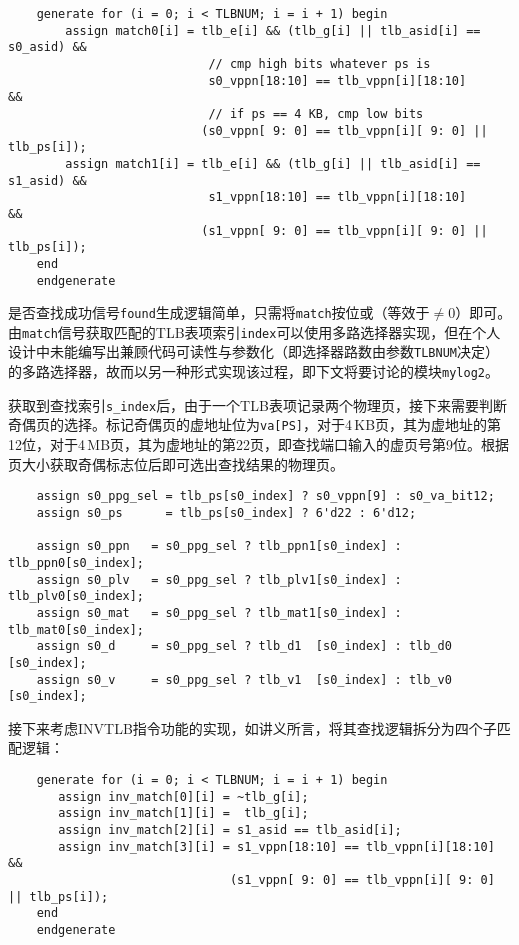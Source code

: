\documentclass[UTF-8,twoside,c5size]{ctexart}
\begin{document}
    \begin{verbatim}
    generate for (i = 0; i < TLBNUM; i = i + 1) begin
        assign match0[i] = tlb_e[i] && (tlb_g[i] || tlb_asid[i] == s0_asid) &&
                            // cmp high bits whatever ps is
                            s0_vppn[18:10] == tlb_vppn[i][18:10]            &&  
                            // if ps == 4 KB, cmp low bits
                           (s0_vppn[ 9: 0] == tlb_vppn[i][ 9: 0] || tlb_ps[i]); 
        assign match1[i] = tlb_e[i] && (tlb_g[i] || tlb_asid[i] == s1_asid) &&
                            s1_vppn[18:10] == tlb_vppn[i][18:10]            &&
                           (s1_vppn[ 9: 0] == tlb_vppn[i][ 9: 0] || tlb_ps[i]);
    end
    endgenerate
    \end{verbatim}
    
    是否查找成功信号\texttt{found}生成逻辑简单，只需将\texttt{match}按位或（等效于$ \neq 0 $）即可。由\texttt{match}信号获取匹配的TLB表项索引\texttt{index}可以使用多路选择器实现，但在个人设计中未能编写出兼顾代码可读性与参数化（即选择器路数由参数\texttt{TLBNUM}决定）的多路选择器，故而以另一种形式实现该过程，即下文将要讨论的模块\texttt{mylog2}。
    
    获取到查找索引\texttt{s_index}后，由于一个TLB表项记录两个物理页，接下来需要判断奇偶页的选择。标记奇偶页的虚地址位为\texttt{va[PS]}，对于4\,KB页，其为虚地址的第12位，对于4\,MB页，其为虚地址的第22页，即查找端口输入的虚页号第9位。根据页大小获取奇偶标志位后即可选出查找结果的物理页。
    
    \begin{verbatim}
    assign s0_ppg_sel = tlb_ps[s0_index] ? s0_vppn[9] : s0_va_bit12;
    assign s0_ps      = tlb_ps[s0_index] ? 6'd22 : 6'd12;

    assign s0_ppn   = s0_ppg_sel ? tlb_ppn1[s0_index] : tlb_ppn0[s0_index];
    assign s0_plv   = s0_ppg_sel ? tlb_plv1[s0_index] : tlb_plv0[s0_index];
    assign s0_mat   = s0_ppg_sel ? tlb_mat1[s0_index] : tlb_mat0[s0_index];
    assign s0_d     = s0_ppg_sel ? tlb_d1  [s0_index] : tlb_d0  [s0_index];
    assign s0_v     = s0_ppg_sel ? tlb_v1  [s0_index] : tlb_v0  [s0_index];
    \end{verbatim}
    
    接下来考虑INVTLB指令功能的实现，如讲义所言，将其查找逻辑拆分为四个子匹配逻辑：
    \begin{verbatim}
    generate for (i = 0; i < TLBNUM; i = i + 1) begin
       assign inv_match[0][i] = ~tlb_g[i];
       assign inv_match[1][i] =  tlb_g[i];
       assign inv_match[2][i] = s1_asid == tlb_asid[i];
       assign inv_match[3][i] = s1_vppn[18:10] == tlb_vppn[i][18:10]            &&
                               (s1_vppn[ 9: 0] == tlb_vppn[i][ 9: 0] || tlb_ps[i]);
    end        
    endgenerate
    \end{verbatim}
    
\end{document}
